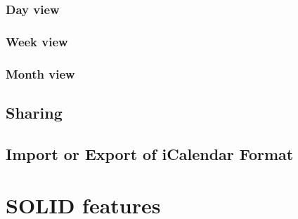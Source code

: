 \subsubsection*{Day view}

\subsubsection*{Week view}

\subsubsection*{Month view}

\subsection*{Sharing}

\subsection*{Import or Export of iCalendar Format}

\section{SOLID features}
